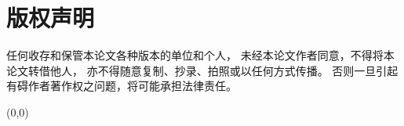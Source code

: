 %
%
%

\chapter*{版权声明}
\thispagestyle{empty}

任何收存和保管本论文各种版本的单位和个人，
未经本论文作者同意，不得将本论文转借他人，
亦不得随意复制、抄录、拍照或以任何方式传播。
否则一旦引起有碍作者著作权之问题，将可能承担法律责任。

\begin{textblock}{1}(0,0)
    \colorbox{white}{
    }
\end{textblock}


